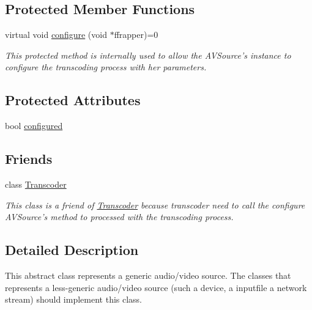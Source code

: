 \subsection*{Protected Member Functions}
\begin{DoxyCompactItemize}
\item 
virtual void \hyperlink{classbr_1_1ufscar_1_1lince_1_1streaming_1_1AVSource_a728f6eaeafe68040ccd8424627658db3}{configure} (void $\ast$ffrapper)=0
\begin{DoxyCompactList}\small\item\em This protected method is internally used to allow the AVSource's instance to configure the transcoding process with her parameters. \item\end{DoxyCompactList}\end{DoxyCompactItemize}
\subsection*{Protected Attributes}
\begin{DoxyCompactItemize}
\item 
bool \hyperlink{classbr_1_1ufscar_1_1lince_1_1streaming_1_1AVSource_ab4ba884cad02dfb18ef5afac68c1e1cf}{configured}
\end{DoxyCompactItemize}
\subsection*{Friends}
\begin{DoxyCompactItemize}
\item 
class \hyperlink{classbr_1_1ufscar_1_1lince_1_1streaming_1_1AVSource_af9f366fbe5cbc06f38791f120c62c182}{Transcoder}
\begin{DoxyCompactList}\small\item\em This class is a friend of \hyperlink{classbr_1_1ufscar_1_1lince_1_1streaming_1_1Transcoder}{Transcoder} because transcoder need to call the configure AVSource's method to processed with the transcoding process. \item\end{DoxyCompactList}\end{DoxyCompactItemize}


\subsection{Detailed Description}
This abstract class represents a generic audio/video source. The classes that represents a less-\/generic audio/video source (such a device, a inputfile a network stream) should implement this class. 

